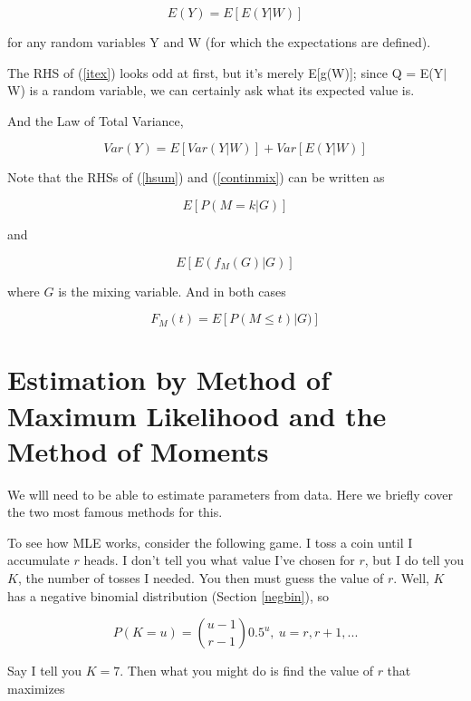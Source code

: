 \begin{equation}
\label{itex}
E(Y)=E[E(Y|W)]
\end{equation}

for any random variables Y and W (for which the expectations are
defined).  

The RHS of (\ref{itex}) looks odd at first, but it's merely E[g(W)];
since Q =  E(Y$|$W) is a random variable, we can certainly ask what its
expected value is.

And the Law of Total Variance,

\begin{equation}
\label{bis}
Var(Y)=E[Var(Y|W)]+Var[E(Y|W)]
\end{equation}

Note that the RHSs of (\ref{hsum}) and (\ref{continmix}) can be written as

\begin{equation}
E[ P(M = k | G) ]
\end{equation}

and

\begin{equation}
E[ E(f_M (G) | G)]
\end{equation}

where $G$ is the mixing variable.  And in both cases

\begin{equation}
F_M(t) = E[ P(M \leq t ) | G) ]
\end{equation}

\section{Estimation by Method of Maximum Likelihood and the Method of
Moments}

We wlll need to be able to estimate parameters from data.  Here we
briefly cover the two most famous methods for this.

To see how MLE works, consider the following game.  I toss a coin until
I accumulate $r$ heads.  I don't tell you what value I've chosen for
$r$, but I do tell you $K$, the number of tosses I needed.  You then
must guess the value of $r$.  Well, $K$ has a negative binomial
distribution (Section \ref{negbin}), so

\begin{equation}
P(K = u) = \binom{u-1}{r-1} 0.5^u,~ u = r, r+1, ...
\end{equation} 

Say I tell you $K = 7$.  Then what you might do is find the value of $r$
that maximizes

